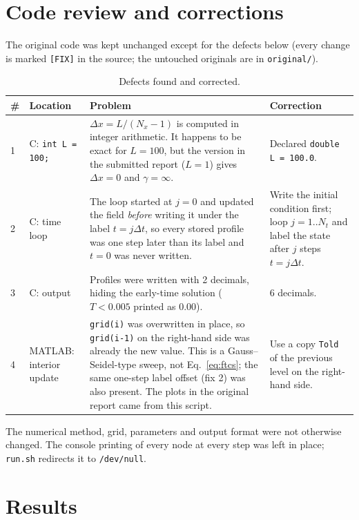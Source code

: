 \section{Code review and corrections}
The original code was kept unchanged except for the defects below (every change is marked \texttt{[FIX]} in the source; the untouched originals are in \texttt{original/}).
\begin{table}[H]\centering\small
\begin{tabular}{p{0.5cm}p{3.4cm}p{5.4cm}p{4.6cm}}\toprule
\# & Location & Problem & Correction\\\midrule
1 & C: \texttt{int L = 100;} & $\Delta x=L/(N_x-1)$ is computed in integer arithmetic. It happens to be exact for $L=100$, but the version in the submitted report ($L=1$) gives $\Delta x=0$ and $\gamma=\infty$. & Declared \texttt{double L = 100.0}.\\
2 & C: time loop & The loop started at $j=0$ and updated the field \emph{before} writing it under the label $t=j\Delta t$, so every stored profile was one step later than its label and $t=0$ was never written. & Write the initial condition first; loop $j=1..N_t$ and label the state after $j$ steps $t=j\Delta t$.\\
3 & C: output & Profiles were written with 2 decimals, hiding the early-time solution ($T<0.005$ printed as 0.00). & 6 decimals.\\
4 & MATLAB: interior update & \texttt{grid(i)} was overwritten in place, so \texttt{grid(i-1)} on the right-hand side was already the new value. This is a Gauss--Seidel-type sweep, not Eq.~\eqref{eq:ftcs}; the same one-step label offset (fix 2) was also present. The plots in the original report came from this script. & Use a copy \texttt{Told} of the previous level on the right-hand side.\\\bottomrule
\end{tabular}\caption{Defects found and corrected.}\end{table}
The numerical method, grid, parameters and output format were not otherwise changed. The console printing of every node at every step was left in place; \texttt{run.sh} redirects it to \texttt{/dev/null}.

\section{Results}
